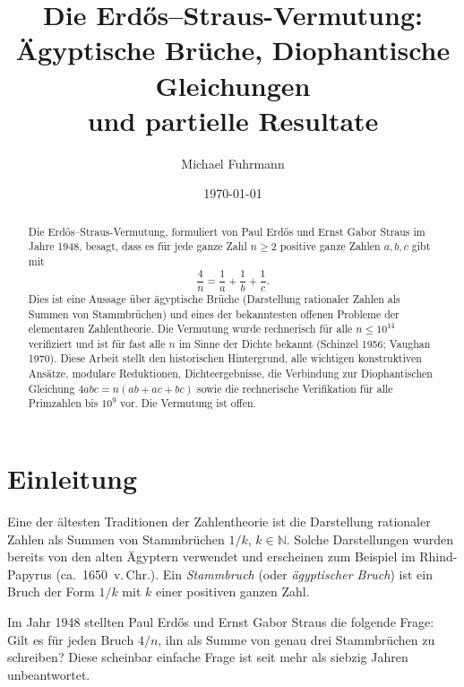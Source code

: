 \documentclass[12pt,a4paper]{amsart}
\theoremstyle{definition}
\newcommand{\N}{\mathbb{N}}
\begin{document}

\title{Die Erd\H{o}s--Straus-Vermutung:\\
       Ägyptische Brüche, Diophantische Gleichungen\\
       und partielle Resultate}

\author{Michael Fuhrmann}
\address{Specialist Mathematics Project, Build 133}
\date{\today}

\begin{abstract}
Die Erd\H{o}s--Straus-Vermutung, formuliert von Paul Erd\H{o}s und Ernst
Gabor Straus im Jahre 1948, besagt, dass es für jede ganze Zahl $n \geq 2$
positive ganze Zahlen $a, b, c$ gibt mit
\[
  \frac{4}{n} = \frac{1}{a} + \frac{1}{b} + \frac{1}{c}.
\]
Dies ist eine Aussage über ägyptische Brüche (Darstellung rationaler Zahlen
als Summen von Stammbrüchen) und eines der bekanntesten offenen Probleme der
elementaren Zahlentheorie.  Die Vermutung wurde rechnerisch für alle
$n \leq 10^{14}$ verifiziert und ist für fast alle $n$ im Sinne der
Dichte bekannt (Schinzel 1956; Vaughan 1970).  Diese Arbeit stellt den
historischen Hintergrund, alle wichtigen konstruktiven Ansätze, modulare
Reduktionen, Dichteergebnisse, die Verbindung zur Diophantischen Gleichung
$4abc = n(ab+ac+bc)$ sowie die rechnerische Verifikation für alle
Primzahlen bis $10^9$ vor.  Die Vermutung ist offen.
\end{abstract}

\maketitle
\tableofcontents

\section{Einleitung}

Eine der ältesten Traditionen der Zahlentheorie ist die Darstellung
rationaler Zahlen als Summen von Stammbrüchen $1/k$, $k \in \N$.
Solche Darstellungen wurden bereits von den alten Ägyptern verwendet
und erscheinen zum Beispiel im Rhind-Papyrus (ca.\ 1650~v.\,Chr.).
Ein \emph{Stammbruch} (oder \emph{ägyptischer Bruch}) ist ein Bruch
der Form $1/k$ mit $k$ einer positiven ganzen Zahl.

Im Jahr 1948 stellten Paul Erd\H{o}s und Ernst Gabor Straus die folgende
Frage: Gilt es für jeden Bruch $4/n$, ihn als Summe von genau drei
Stammbrüchen zu schreiben?  Diese scheinbar einfache Frage ist seit
mehr als siebzig Jahren unbeantwortet.
\end{document}
